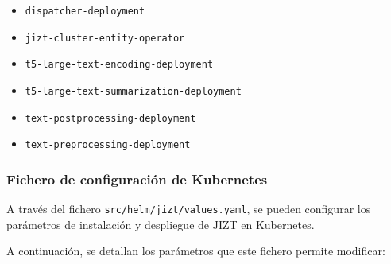 \vspace{-0.3cm}
\begin{itemize} [\textbullet]
	\tightlist
	\item \texttt{dispatcher-deployment}
	\item \texttt{jizt-cluster-entity-operator}
	\item \texttt{t5-large-text-encoding-deployment}
	\item \texttt{t5-large-text-summarization-deployment}
	\item \texttt{text-postprocessing-deployment}
	\item \texttt{text-preprocessing-deployment}
\end{itemize}

\subsubsection{Fichero de configuración de Kubernetes}

A través del fichero \texttt{src/helm/jizt/values.yaml}, se pueden configurar los parámetros de instalación y despliegue de JIZT en Kubernetes.

A continuación, se detallan los parámetros que este fichero permite modificar:

